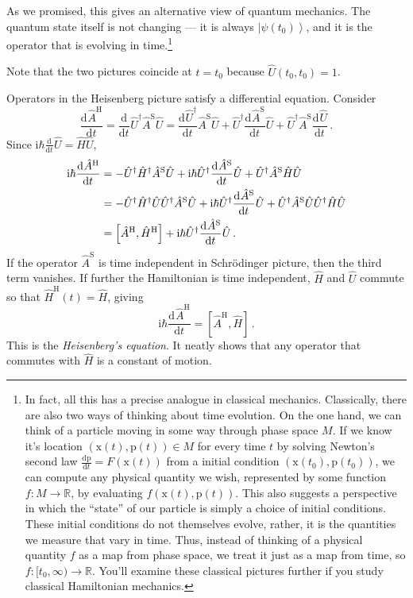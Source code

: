\documentclass{article}
\theoremstyle{plain}\theoremheaderfont{\normalfont\itshape}\theorembodyfont{\rmfamily}\theoremseparator{.}\newtheorem*{rem}{Remark}\newtheorem*{ex}{Example}\newtheorem*{proof}{Proof}\newtheorem*{altp}{Alternative proof}
\theoremstyle{plain}\theoremheaderfont{\normalfont\bfseries}\theorembodyfont{\rmfamily}\theoremseparator{.}\newtheorem{thm}{Theorem}[section]\newtheorem{lem}[thm]{Lemma}\newtheorem{prop}[thm]{Proposition}\newtheorem*{cor}{Corollary}\newtheorem{defn}[thm]{Definition}\newtheorem{clm}[thm]{Claim}\newtheorem{clminproof}{Claim}
\theoremstyle{break}\theoremheaderfont{\normalfont\itshape}\theorembodyfont{\rmfamily}\theoremseparator{.\medskip}\newtheorem*{proofskip}{Proof}\newtheorem*{exs}{Examples}\newtheorem*{rems}{Remarks}
\theoremstyle{break}\theoremheaderfont{\normalfont\bfseries}\theorembodyfont{\rmfamily}\theoremseparator{.\medskip}\newtheorem{lemskip}[thm]{Lemma}\newtheorem{defnskip}[thm]{Definition}\newtheorem{propskip}[thm]{Proposition}\newtheorem{thmskip}[thm]{Theorem}
\numberwithin{equation}{section}
\newcommand{\ii}{\mathrm{i}}
\newcommand{\dv}[3][]{\frac{\mathrm{d}^{#1} #2}{{\mathrm{d} #3}^{#1}}}
\newcommand{\ket}[1]{\left| #1 \right\rangle}
\newcommand{\vb}[1]{\bm{\mathrm{#1}}}
\newcommand{\RR}{\mathbb{R}}
\newcommand{\Sch}{^{\mathrm{S}}}
\newcommand{\Hei}{^{\mathrm{H}}}
\begin{document}
    As we promised, this gives an alternative view of quantum mechanics. The quantum state itself is not changing --- it is always \(\ket{\psi(t_0)}\), and it is the operator that is evolving in time.\footnote{In fact, all this has a precise analogue in classical mechanics. Classically, there are also two ways of thinking about time evolution. On the one hand, we can think of a particle moving in some way through phase space \(M\). If we know it's location \((\vb{x}(t),\vb{p}(t))\in M\) for every time \(t\) by solving Newton's second law \(\dv{\vb{p}}{t}=F(\vb{x}(t))\) from a initial condition \((\vb{x}(t_0),\vb{p}(t_0))\), we can compute any physical quantity we wish, represented by some function \(f:M\to\RR\), by evaluating \(f(\vb{x}(t),\vb{p}(t))\). This also suggests a perspective in which the ``state'' of our particle is simply a choice of initial conditions. These initial conditions do not themselves evolve, rather, it is the quantities we measure that vary in time. Thus, instead of thinking of a physical quantity \(f\) as a map from phase space, we treat it just as a map from time, so \(f:[t_0,\infty)\to\RR\). You'll examine these classical pictures further if you study classical Hamiltonian mechanics.}

    Note that the two pictures coincide at \(t=t_0\) because \(\hat{U}(t_0,t_0)=1\).

    Operators in the Heisenberg picture satisfy a differential equation. Consider
    \begin{equation}
        \dv{\hat{A}\Hei}{t}=\dv{}{t}\hat{U}^\dagger\hat{A}\Sch\hat{U}=\dv{\hat{U}^\dagger}{t}\hat{A}\Sch\hat{U}+\hat{U}^\dagger\dv{\hat{A}\Sch}{t}\hat{U}+\hat{U}^\dagger\hat{A}\Sch\dv{\hat{U}}{t}\,.
    \end{equation}
    Since \(\ii\hbar\dv{}{t}\hat{U}=\hat{H}\hat{U}\),
    \begin{align}
        \ii\hbar\dv{\hat{A}\Hei}{t}&=-\hat{U}^\dagger\hat{H}^\dagger\hat{A}\Sch\hat{U}+\ii\hbar\hat{U}^\dagger\dv{\hat{A}\Sch}{t}\hat{U}+\hat{U}^\dagger\hat{A}\Sch\hat{H}\hat{U}\notag \\
        &=-\hat{U}^\dagger\hat{H}^\dagger\hat{U}\hat{U}^\dagger\hat{A}\Sch\hat{U}+\ii\hbar\hat{U}^\dagger\dv{\hat{A}\Sch}{t}\hat{U}+\hat{U}^\dagger\hat{A}\Sch\hat{U}\hat{U}^\dagger\hat{H}\hat{U}\notag \\
        &=\left[\hat{A}\Hei,\hat{H}\Hei\right]+\ii\hbar\hat{U}^\dagger\dv{\hat{A}\Sch}{t}\hat{U}\,.
    \end{align}
    If the operator \(\hat{A}\Sch\) is time independent in Schr\"{o}dinger picture, then the third term vanishes. If further the Hamiltonian is time independent, \(\hat{H}\) and \(\hat{U}\) commute so that \(\hat{H}\Hei(t)=\hat{H}\), giving
    \begin{equation}
        \ii\hbar\dv{\hat{A}\Hei}{t}=\left[\hat{A}\Hei,\hat{H}\right]\,.
    \end{equation}
    This is the \textit{Heisenberg's equation}. It neatly shows that any operator that commutes with \(\hat{H}\) is a constant of motion.
\end{document}
